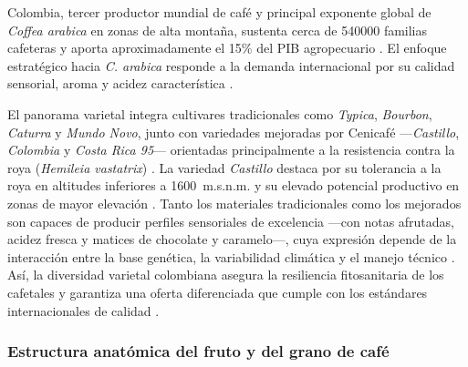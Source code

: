 Colombia, tercer productor mundial de café y principal exponente global de 
\textit{Coffea arabica} en zonas de alta montaña, sustenta cerca de 540000 familias 
cafeteras y aporta aproximadamente el 15\% del PIB agropecuario 
\parencite{betancourt_agricultural_2024, gomez-godinez_exploring_2024}. El enfoque 
estratégico hacia \textit{C. arabica} responde a la demanda internacional por su 
calidad sensorial, aroma y acidez característica 
\parencite{escuela_superior_politecnica_agropecuaria_de_manabi_manuel_felix_lopez_carrera_de_ingenieria_agricola_postharvest_2023, 
park_comparative_2025}.

El panorama varietal integra cultivares tradicionales como \textit{Typica}, 
\textit{Bourbon}, \textit{Caturra} y \textit{Mundo Novo}, junto con variedades 
mejoradas por Cenicafé —\textit{Castillo}, \textit{Colombia} y \textit{Costa Rica 
95}— orientadas principalmente a la resistencia contra la roya (\textit{Hemileia 
vastatrix}) \parencite{gallardo-ignacio_chemical_2023, rodriguez_effect_2020, 
febrianto_coffee_2023}. La variedad \textit{Castillo} destaca por su tolerancia a 
la roya en altitudes inferiores a 1600~m.s.n.m. y su elevado potencial productivo 
en zonas de mayor elevación \parencite{rodriguez_effect_2020}. Tanto los materiales 
tradicionales como los mejorados son capaces de producir perfiles sensoriales de 
excelencia —con notas afrutadas, acidez fresca y matices de chocolate y caramelo—, 
cuya expresión depende de la interacción entre la base genética, la variabilidad 
climática y el manejo técnico \parencite{gallardo-ignacio_chemical_2023, 
rodriguez_effect_2020, osorio_hernandez_simulation_2015, tieghi_effects_2024}. 
Así, la diversidad varietal colombiana asegura la resiliencia fitosanitaria de los 
cafetales y garantiza una oferta diferenciada que cumple con los estándares 
internacionales de calidad \parencite{rodriguez_effect_2020, tieghi_effects_2024}.

\subsubsection{Estructura anatómica del fruto y del grano de café}

